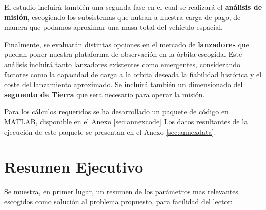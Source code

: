 El estudio incluirá también una segunda fase en el cual se realizará el \textbf{análisis de misión}, escogiendo los subsistemas que nutran a nuestra carga de pago, de manera que podamos aproximar una masa total del vehículo espacial.

Finalmente, se evaluarán distintas opciones en el mercado de \textbf{lanzadores} que puedan poner nuestra plataforma de observación en la órbita escogida. Este análisis incluirá tanto lanzadores existentes como emergentes, considerando factores como la capacidad de carga a la orbita deseada la fiabilidad histórica y el coste del lanzamiento aproximado. Se incluirá también un dimensionado del \textbf{segmento de Tierra} que sera necesario para operar la misión.

Para los cálculos requeridos se ha desarrollado un paquete de código en MATLAB, disponible en el Anexo \ref{sec:annexcode} Los datos resultantes de la ejecución de este paquete se presentan en el Anexo \ref{sec:annexdata}.

\newpage
\section{Resumen Ejecutivo}

Se muestra, en primer lugar, un resumen de los parámetros mas relevantes escogidos como solución al problema propuesto, para facilidad del lector:
\hfill \break

